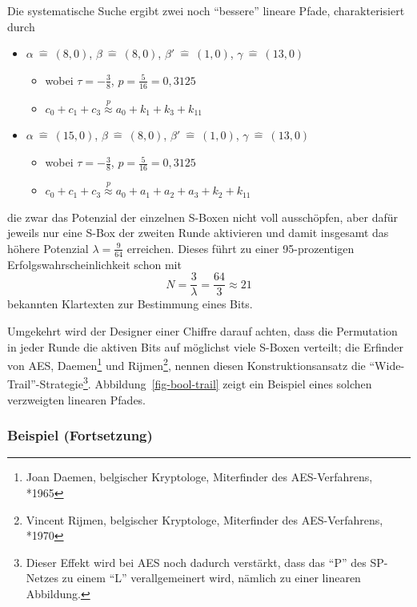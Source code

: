 \begin{refsegment}
Die systematische Suche ergibt zwei noch "`bessere"' lineare Pfade,
charakterisiert durch
\begin{itemize}
   \item $\alpha \:\hat{=}\: (8,0)$, $\beta \:\hat{=}\: (8,0)$, $\beta' \:\hat{=}\: (1,0)$,
      $\gamma \:\hat{=}\: (13,0)$
   \begin{itemize}
      \item wobei $\tau = -\frac{3}{8}$, $p = \frac{5}{16} = 0,3125$
      \item $c_0 + c_1 + c_3 \stackrel{p}{\approx} a_0 + k_1 + k_3 + k_{11}$
   \end{itemize}
   \item $\alpha \:\hat{=}\: (15,0)$, $\beta \:\hat{=}\: (8,0)$, $\beta' \:\hat{=}\: (1,0)$,
      $\gamma \:\hat{=}\: (13,0)$
   \begin{itemize}
      \item wobei $\tau = -\frac{3}{8}$, $p = \frac{5}{16} = 0,3125$
      \item $c_0 + c_1 + c_3 \stackrel{p}{\approx} a_0 + a_1 + a_2 + a_3 + k_2 + k_{11}$
   \end{itemize}
\end{itemize}
die zwar das Potenzial der einzelnen S-Boxen nicht voll ausschöpfen, aber
dafür jeweils nur eine S-Box der zweiten Runde aktivieren und damit insgesamt
das höhere Potenzial $\lambda = \frac{9}{64}$ erreichen. Dieses führt zu einer
95-prozentigen Erfolgswahrscheinlichkeit schon mit
\[
     N = \frac{3}{\lambda} = \frac{64}{3} \approx 21
\]
bekannten Klartexten
zur Bestimmung eines Bits.

Umgekehrt wird der Designer einer Chiffre darauf achten, dass die
Permutation in jeder Runde die aktiven Bits auf möglichst viele S-Boxen
verteilt; die Erfinder von AES, Daemen\footnote{%
   Joan Daemen, belgischer Kryptologe, Miterfinder des AES-Verfahrens, *1965
} und Rijmen\footnote{%
   Vincent Rijmen, belgischer Kryptologe, Miterfinder des AES-Verfahrens, *1970
}, nennen diesen
Konstruktionsansatz die "`Wide-Trail"'-Strategie\footnote{%
   Dieser Effekt wird bei AES noch dadurch verstärkt, dass das "`P"'
   des SP-Netzes zu einem "`L"' verallgemeinert wird, nämlich zu einer
   linearen Abbildung.
}.
Abbildung~\ref{fig-bool-trail} zeigt ein Beispiel eines solchen verzweigten
linearen Pfades.

\subsubsection*{Beispiel (Fortsetzung)}


\end{refsegment}
